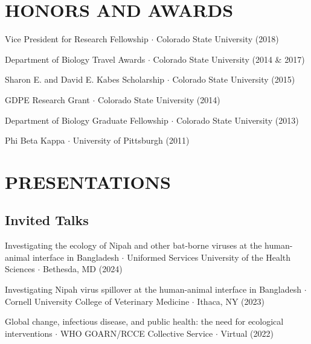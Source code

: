 \documentclass{cv}
\begin{document}


\section*{HONORS AND AWARDS}

Vice President for Research Fellowship $\cdot$ Colorado State University (2018) %

Department of Biology Travel Awards $\cdot$ Colorado State University (2014 \& 2017) %

Sharon E. and David E. Kabes Scholarship $\cdot$ Colorado State University (2015) %

GDPE Research Grant $\cdot$ Colorado State University (2014) %

Department of Biology Graduate Fellowship $\cdot$ Colorado State University (2013) %

Phi Beta Kappa $\cdot$ University of Pittsburgh (2011)



\section*{PRESENTATIONS}

\subsection*{Invited Talks}

Investigating the ecology of Nipah and other bat-borne viruses at the human-animal interface in Bangladesh $\cdot$ Uniformed Services University of the Health Sciences $\cdot$ Bethesda, MD (2024)

Investigating Nipah virus spillover at the human-animal interface in Bangladesh $\cdot$ Cornell University College of Veterinary Medicine $\cdot$ Ithaca, NY (2023)

Global change, infectious disease, and public health: the need for ecological interventions $\cdot$ WHO GOARN/RCCE Collective Service $\cdot$ Virtual (2022)
\end{document}
